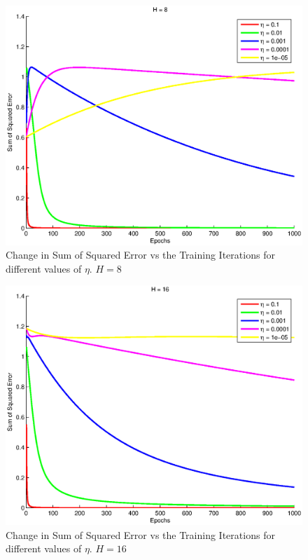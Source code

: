 \documentclass{article}
\newcommand{\myScale}{0.56}
\begin{document}
\begin{figure}[H]
\includegraphics[scale=\myScale]{../eps2/H8.eps}
\caption{Change in Sum of Squared Error vs the Training Iterations for different values of $\eta$. $H=8$}
\label{fig:fig8}
\end{figure}
\begin{figure}[H]
\includegraphics[scale=\myScale]{../eps2/H16.eps}
\caption{Change in Sum of Squared Error vs the Training Iterations for different values of $\eta$. $H=16$}
\label{fig:fig9}
\end{figure}
\end{document}

